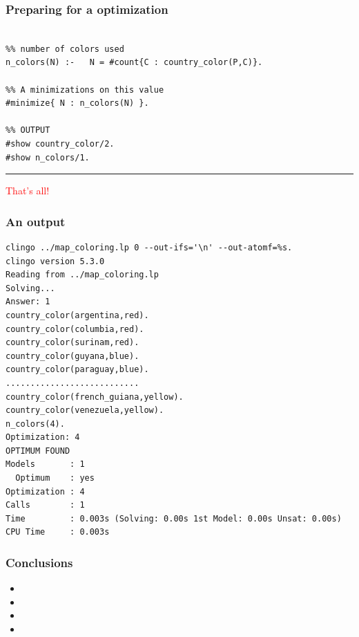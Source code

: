 \documentclass{beamer}
\begin{document}
\begin{frame}[fragile]
	\frametitle{Preparing for a optimization}

{\small
\begin{verbatim}
	
%% number of colors used
n_colors(N) :-   N = #count{C : country_color(P,C)}.

%% A minimizations on this value
#minimize{ N : n_colors(N) }.

%% OUTPUT
#show country_color/2.
#show n_colors/1.
\end{verbatim}
}	
\textcolor{red}{\hrule \vskip 0.2cm That's all!}
\end{frame}
\begin{frame} [fragile]
\frametitle{An output}
	
{\small
\begin{verbatim}
clingo ../map_coloring.lp 0 --out-ifs='\n' --out-atomf=%s. 
clingo version 5.3.0
Reading from ../map_coloring.lp
Solving...
Answer: 1
country_color(argentina,red).
country_color(columbia,red).
country_color(surinam,red).
country_color(guyana,blue).
country_color(paraguay,blue).
...........................
country_color(french_guiana,yellow).
country_color(venezuela,yellow).
n_colors(4).
Optimization: 4
OPTIMUM FOUND
Models       : 1
  Optimum    : yes
Optimization : 4
Calls        : 1
Time         : 0.003s (Solving: 0.00s 1st Model: 0.00s Unsat: 0.00s)
CPU Time     : 0.003s
\end{verbatim}
}	
\end{frame}


\begin{frame} 
	\frametitle{Conclusions}
	
\begin{block}{}
	
	\begin{itemize}
		\item 

		\item 
		\item 
		
		\item 
		
	\end{itemize}
\end{block}
\end{frame}
\end{document}
